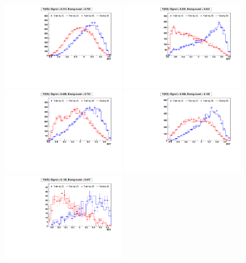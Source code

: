 \begin{figure}[hbtp]
 \begin{center}
   \includegraphics[width=0.45\textwidth]{Figures/Analysis_2_Diagrams/LJ_plots_lep/training/BDT_training_623.pdf}
   \includegraphics[width=0.45\textwidth]{Figures/Analysis_2_Diagrams/LJ_plots_lep/training/BDT_training_433.pdf}
   \includegraphics[width=0.45\textwidth]{Figures/Analysis_2_Diagrams/LJ_plots_lep/training/BDT_training_533.pdf}
   \includegraphics[width=0.45\textwidth]{Figures/Analysis_2_Diagrams/LJ_plots_lep/training/BDT_training_633.pdf}
   \includegraphics[width=0.45\textwidth]{Figures/Analysis_2_Diagrams/LJ_plots_lep/training/BDT_training_443.pdf}

\end{center}
\end{figure}
